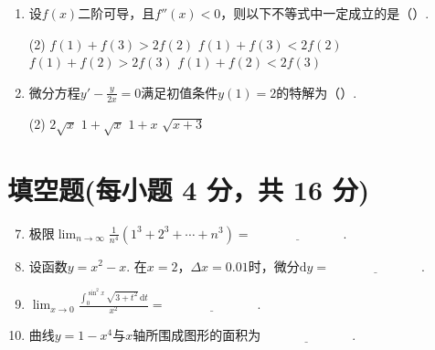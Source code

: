 \documentclass[../main.tex]{subfiles}
\begin{document}
\begin{enumerate}
    \item 设$f(x)$二阶可导，且$f''(x)<0$，则以下不等式中一定成立的是（\qquad）.

          \begin{tasks}[label=\textbf{\Alph*.}, label-width=1.5em, column-sep=1em](2)
              \task $f(1)+f(3)>2f(2)$
              \task $f(1)+f(3)<2f(2)$
              \task $f(1)+f(2)>2f(3)$
              \task $f(1)+f(2)<2f(3)$
          \end{tasks}

    \item 微分方程$y'-\frac{y}{2x}=0$满足初值条件$y(1)=2$的特解为（\qquad）.

          \begin{tasks}[label=\textbf{\Alph*.}, label-width=1.5em, column-sep=1em](2)
              \task $2\sqrt{x}$
              \task $1+\sqrt{x}$
              \task $1+x$
              \task $\sqrt{x+3}$
          \end{tasks}
\end{enumerate}

\section{填空题(每小题 4 分，共 16 分)}
\begin{enumerate}
    \setcounter{enumi}{6}
    \item 极限$\lim_{n\to\infty}\frac{1}{n^{4}}\left(1^{3}+2^{3}+\cdots+n^{3}
              \right)=\underline{\hspace{3cm}}$.
          \vspace{0.5em}

    \item 设函数$y=x^{2}-x$. 在$x=2$，$\Delta x=0.01$时，微分$\mathrm{d}y=\underline
              {\hspace{3cm}}$.
          \vspace{0.5em}

    \item $\lim_{x\to0}\frac{\displaystyle\int_{0}^{\sin^2 x}\sqrt{3+t^2}\,\mathrm{d}t}{x^{2}}
              =\underline{\hspace{3cm}}$.
          \vspace{0.5em}

    \item 曲线$y=1-x^{4}$与$x$轴所围成图形的面积为$\underline{\hspace{3cm}}$.
\end{enumerate}
\end{document}
